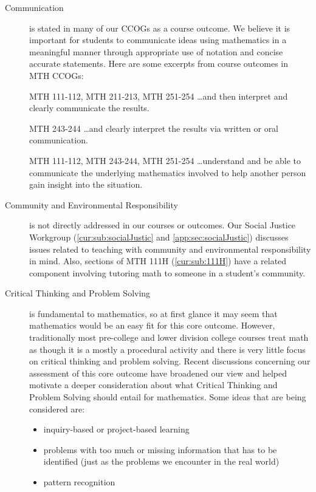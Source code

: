 \begin{description}
\item[Communication] is stated in many of our CCOGs as a course outcome. We believe it is important for students to communicate ideas using mathematics in a meaningful manner through appropriate use of notation and concise accurate statements.  Here are some excerpts from course outcomes in MTH CCOGs: 
\begin{aquote}{MTH 111-112, MTH 211-213, MTH 251-254}
{\ldots}and then interpret and clearly communicate the results. 
\end{aquote}

\begin{aquote}{MTH 243-244}
{\ldots}and clearly interpret the results via written or oral communication. 
\end{aquote}

\begin{aquote}{MTH 111-112, MTH 243-244, MTH 251-254}
{\ldots}understand and be able to communicate the underlying mathematics involved to help another person gain insight into the situation.
\end{aquote}

\item[Community and Environmental Responsibility] is not directly addressed in our courses or outcomes. Our Social Justice Workgroup (\vref{cur:sub:socialJustic} and \vref{app:sec:socialJustic}) discusses issues related to teaching with community and environmental responsibility in mind. Also, sections of MTH 111H (\vref{cur:sub:111H}) have a related component involving tutoring math to someone in a student's community. 

\item[Critical Thinking and Problem Solving] is fundamental to mathematics, so at first glance it may seem that mathematics would be an easy fit for this core outcome.  However, traditionally most pre-college and lower division college courses treat math as though it is a mostly a procedural activity and there is very little focus on critical thinking and problem solving.  Recent discussions concerning our assessment of this core outcome have broadened our view and helped motivate a deeper consideration about what Critical Thinking and Problem Solving should entail for mathematics.  Some ideas that are being considered are:
\begin{itemize}
\item inquiry-based or project-based learning
\item problems with too much or missing information that has to be identified (just as the problems we encounter in the real world)
\item pattern recognition
\end{itemize}


\end{description}
